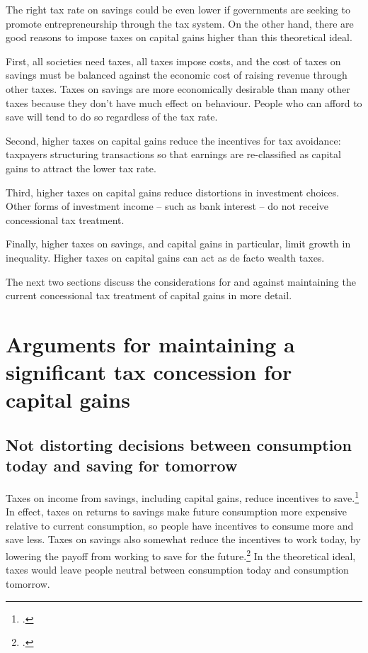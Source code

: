 The right tax rate on savings could be even lower if governments are seeking to promote entrepreneurship through the tax system.
On the other hand, there are good reasons to impose taxes on capital gains higher than this theoretical ideal.

First, all societies need taxes, all taxes impose costs, and the cost of taxes on savings must be balanced against the economic cost of raising revenue through other taxes. Taxes on savings are more economically desirable than many other taxes because they don’t have much effect on behaviour. People who can afford to save will tend to do so regardless of the tax rate.

Second, higher taxes on capital gains reduce the incentives for tax avoidance: taxpayers structuring transactions so that earnings are re-classified as capital gains to attract the lower tax rate.

Third, higher taxes on capital gains reduce distortions in investment choices. Other forms of investment income – such as bank interest – do not receive concessional tax treatment. 

Finally, higher taxes on savings, and capital gains in particular, limit growth in inequality. Higher taxes on capital gains can act as de facto wealth taxes.  

The next two sections discuss the considerations for and against maintaining the current concessional tax treatment of capital gains in more detail.


\section{Arguments for maintaining a significant tax concession for capital gains}
\subsection{Not distorting decisions between consumption today and saving for tomorrow}
Taxes on income from savings, including capital gains, reduce incentives to save.\footcites[][32]{HenryTaxReview2010}[][58]{Treasury2015ReThink}[][295]{MirrleesAdamBesleyEtAl2011}  In effect, taxes on returns to savings make future consumption more expensive relative to current consumption, so people have incentives to consume more and save less. Taxes on savings also somewhat reduce the incentives to work today, by lowering the payoff from working to save for the future.\footcite[][12]{HenryTaxReview2010}  In the theoretical ideal, taxes would leave people neutral between consumption today and consumption tomorrow.


